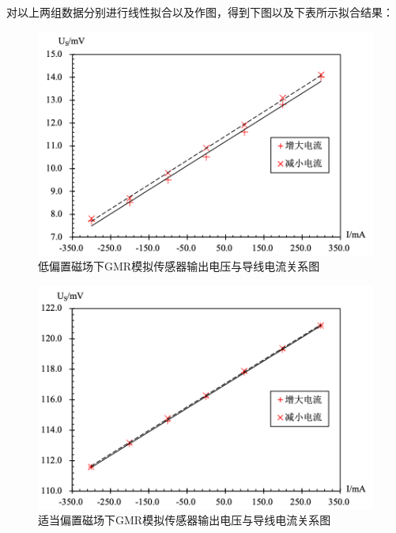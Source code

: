 \documentclass{thuemp}
\begin{document}
对以上两组数据分别进行线性拟合以及作图，得到下图以及下表所示拟合结果：

\begin{figure}[H]
    \centering
    \includegraphics[width=1.0\linewidth]{../Data/GMR-Plot-04-01-excel.png}
    \caption{低偏置磁场下GMR模拟传感器输出电压与导线电流关系图} \label{fig:gmr_current_low}
\end{figure}

\begin{figure}[H]
    \centering
    \includegraphics[width=1.0\linewidth]{../Data/GMR-Plot-04-02-excel.png}
    \caption{适当偏置磁场下GMR模拟传感器输出电压与导线电流关系图} \label{fig:gmr_current}
\end{figure}
\end{document}
